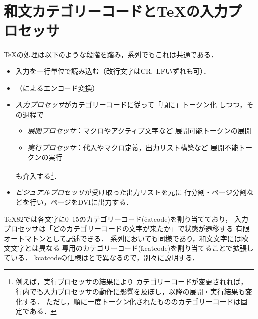 \documentclass[a4paper,11pt,nomag,dvipdfmx]{jsarticle}
\begin{document}
\section{和文カテゴリーコードと\TeX の入力プロセッサ}

\TeX の処理は以下のような段階を踏み，\pTeX 系列でもこれは共通である．
\begin{itemize}
 \item 入力を一行単位で読み込む（改行文字はCR,~LFいずれも可）．
 \item （によるエンコード変換）
 \item \emph{入力プロセッサ}がカテゴリーコードに従って「順に」トークン化
   しつつ，その過程で
  \begin{itemize}
   \item \emph{展開プロセッサ}：マクロやアクティブ文字など
     展開可能トークンの展開
   \item \emph{実行プロセッサ}：代入やマクロ定義，出力リスト構築など
     展開不能トークンの実行
  \end{itemize}
   も介入する\footnote{例えば，実行プロセッサの結果により
   カテゴリーコードが変更されれば，
   行内でも入力プロセッサの動作に影響を及ぼし，以降の展開・実行結果も変化する．
   ただし，順に一度トークン化されたもののカテゴリーコードは固定である．}．
 \item \emph{ビジュアルプロセッサ}が受け取った出力リストを元に
   行分割・ページ分割などを行い，ページをDVIに出力する．
\end{itemize}

\TeX82では各文字に0--15のカテゴリーコード(\.{catcode})を割り当てており，
入力プロセッサは「どのカテゴリーコードの文字が来たか」で状態が遷移する
有限オートマトンとして記述できる\cite{topic}．
\pTeX 系列においても同様であり，和文文字には欧文文字とは異なる
専用のカテゴリーコード(\.{kcatcode})を割り当てることで拡張している．
\.{kcatcode}の仕様は\pTeX と\upTeX で異なるので，別々に説明する．
\end{document}

